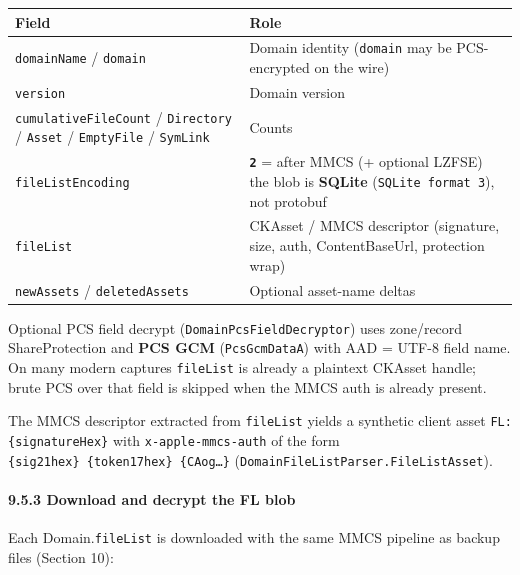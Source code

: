 \documentclass[
  english,
  10pt]{article}
\newcounter{none} %
\begin{document}
{\def\LTcaptype{none} %
\begin{longtable}[]{@{}
  >{\raggedright\arraybackslash}p{}
  >{\raggedright\arraybackslash}p{}@{}}
\toprule\noalign{}
\begin{minipage}[b]{\linewidth}\raggedright
Field
\end{minipage} & \begin{minipage}[b]{\linewidth}\raggedright
Role
\end{minipage} \\
\midrule\noalign{}
\endhead
\bottomrule\noalign{}
\endlastfoot
\texttt{domainName} / \texttt{domain} & Domain identity (\texttt{domain}
may be PCS-encrypted on the wire) \\
\texttt{version} & Domain version \\
\texttt{cumulativeFileCount} / \texttt{Directory} / \texttt{Asset} /
\texttt{EmptyFile} / \texttt{SymLink} & Counts \\
\texttt{fileListEncoding} & \textbf{\texttt{2}} = after MMCS (+ optional
LZFSE) the blob is \textbf{SQLite} (\texttt{SQLite\ format\ 3}), not
protobuf \\
\texttt{fileList} & CKAsset / MMCS descriptor (signature, size, auth,
ContentBaseUrl, protection wrap) \\
\texttt{newAssets} / \texttt{deletedAssets} & Optional asset-name
deltas \\
\end{longtable}
}

Optional PCS field decrypt (\texttt{DomainPcsFieldDecryptor}) uses
zone/record ShareProtection and \textbf{PCS GCM} (\texttt{PcsGcmDataA})
with AAD = UTF-8 field name. On many modern captures \texttt{fileList}
is already a plaintext CKAsset handle; brute PCS over that field is
skipped when the MMCS auth is already present.

The MMCS descriptor extracted from \texttt{fileList} yields a synthetic
client asset \texttt{FL:\{signatureHex\}} with
\texttt{x-apple-mmcs-auth} of the form
\texttt{\{sig21hex\}\ \{token17hex\}\ \{CAog…\}}
(\texttt{DomainFileListParser.FileListAsset}).

\paragraph{9.5.3 Download and decrypt the FL
blob}\label{download-and-decrypt-the-fl-blob}

Each Domain.\texttt{fileList} is downloaded with the same MMCS pipeline
as backup files (Section 10):
\end{document}

